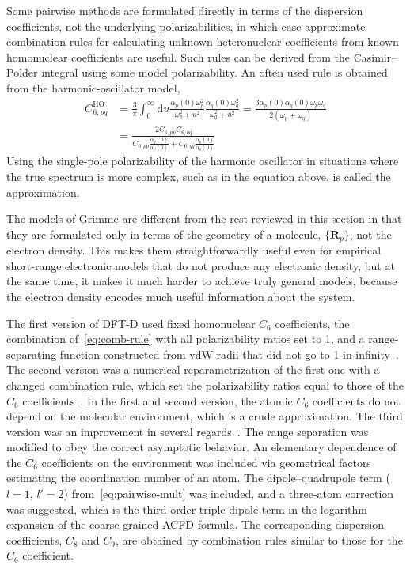 Some pairwise methods are formulated directly in terms of the dispersion coefficients, not the underlying polarizabilities, in which case approximate combination rules for calculating unknown heteronuclear coefficients from known homonuclear coefficients are useful.
Such rules can be derived from the Casimir--Polder integral using some model polarizability.
An often used rule is obtained from the harmonic-oscillator model,
\begin{equation}
\begin{aligned}
  C_{6,pq}^\text{HO}&=\frac3\pi\int_0^\infty\mathrm du\frac{\alpha_p(0)\omega_p^2}{\omega_p^2+u^2}\frac{\alpha_q(0)\omega_q^2}{\omega_q^2+u^2}=\frac{3\alpha_p(0)\alpha_q(0)\omega_p\omega_q}{2(\omega_p+\omega_q)} \\
  &=\frac{2C_{6,pp}C_{6,qq}}{C_{6,pp}\frac{\alpha_q(0)}{\alpha_p(0)}+C_{6,qq}\frac{\alpha_p(0)}{\alpha_q(0)}}
\end{aligned}
\label{eq:comb-rule}
\end{equation}
Using the single-pole polarizability of the harmonic oscillator in situations where the true spectrum is more complex, such as in the equation above, is called the \citet{UnsoldZP27} approximation.

The models of Grimme are different from the rest reviewed in this section in that they are formulated only in terms of the geometry of a molecule, $\{\mathbf R_p\}$, not the electron density.
This makes them straightforwardly useful even for empirical short-range electronic models that do not produce any electronic density, but at the same time, it makes it much harder to achieve truly general models, because the electron density encodes much useful information about the system.

The first version of DFT-D used fixed homonuclear $C_6$ coefficients, the combination of~\eqref{eq:comb-rule} with all polarizability ratios set to 1, and a range-separating function constructed from vdW radii that did not go to 1 in infinity~\cite{GrimmeJCC04}.
The second version was a numerical reparametrization of the first one with a changed combination rule, which set the polarizability ratios equal to those of the $C_6$ coefficients~\cite{GrimmeJCC06}.
In the first and second version, the atomic $C_6$ coefficients do not depend on the molecular environment, which is a crude approximation.
The third version was an improvement in several regards~\cite{GrimmeJCP10}.
The range separation was modified to obey the correct asymptotic behavior.
An elementary dependence of the $C_6$ coefficients on the environment was included via geometrical factors estimating the coordination number of an atom.
The dipole--quadrupole term ($l=1$, $l'=2$) from~\eqref{eq:pairwise-mult} was included, and a three-atom correction was suggested, which is the third-order triple-dipole term in the logarithm expansion of the coarse-grained ACFD formula.
The corresponding dispersion coefficients, $C_8$ and $C_9$, are obtained by combination rules similar to those for the $C_6$ coefficient.

